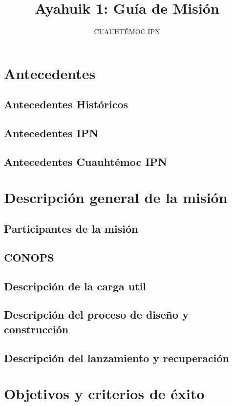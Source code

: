 \documentclass[letterpaper,12pt]{article} %
\title{Ayahuik 1: Guía de Misión}
\author{CUAUHTÉMOC IPN}
\begin{document}
\section{Antecedentes}

    \subsection{Antecedentes Históricos}

    \subsection{Antecedentes IPN}

    \subsection{Antecedentes Cuauhtémoc IPN}

\section{Descripción general de la misión}

    \subsection{Participantes de la misión}

    \subsection{CONOPS}

    \subsection{Descripción de la carga util}

    \subsection{Descripción del proceso de diseño y construcción}

    \subsection{Descripción del lanzamiento y recuperación}

\section{Objetivos y criterios de éxito}
\end{document}
